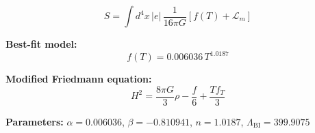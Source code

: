 
\begin{equation}
  S = \int d^4x \, |e| \, \frac{1}{16\pi G} \left[ f(T) + \mathcal{L}_m \right]
\end{equation}

\textbf{Best-fit model:}
\begin{equation}
  f(T) = 0.006036 \, T^{1.0187}
\end{equation}

\textbf{Modified Friedmann equation:}
\begin{equation}
  H^2 = \frac{8\pi G}{3} \rho - \frac{f}{6} + \frac{T f_T}{3}
\end{equation}

\textbf{Parameters:}
$\alpha = 0.006036$, \quad
$\beta = -0.810941$, \quad
$n = 1.0187$, \quad
$\Lambda_{\text{BI}} = 399.9075$